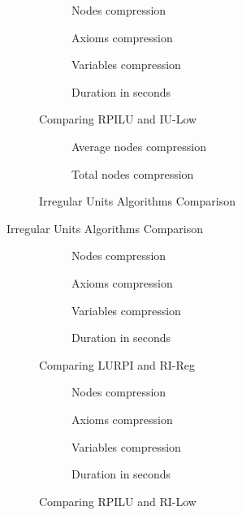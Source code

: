 \begin{figure}[hbt]
  \begin{subfigure}{0.5\textwidth}
    \centering
    \caption{Nodes compression}
  \end{subfigure}
  \begin{subfigure}{0.5\textwidth}
    \centering
    \caption{Axioms compression}
  \end{subfigure}
  \begin{subfigure}{0.5\textwidth}
    \centering
    \caption{Variables compression}
  \end{subfigure}
  \begin{subfigure}{0.5\textwidth}
    \centering
    \caption{Duration in seconds}
  \end{subfigure}
  \caption{Comparing RPILU and IU-Low}
\end{figure}
\begin{figure}[hbt]
  \begin{subfigure}{0.5\textwidth}
    \centering
    \caption{Average nodes compression}
  \end{subfigure}
  \begin{subfigure}{0.5\textwidth}
    \centering
    \caption{Total nodes compression}
  \end{subfigure}
  \caption{Irregular Units Algorithms Comparison}
\end{figure}
\begin{table}[hbt]
  \centering
  \caption{Irregular Units Algorithms Comparison}
\end{table}
\begin{figure}[hbt]
  \begin{subfigure}{0.5\textwidth}
    \centering
    \caption{Nodes compression}
  \end{subfigure}
  \begin{subfigure}{0.5\textwidth}
    \centering
    \caption{Axioms compression}
  \end{subfigure}
  \begin{subfigure}{0.5\textwidth}
    \centering
    \caption{Variables compression}
  \end{subfigure}
  \begin{subfigure}{0.5\textwidth}
    \centering
    \caption{Duration in seconds}
  \end{subfigure}
  \caption{Comparing LURPI and RI-Reg}
\end{figure}
\begin{figure}[hbt]
  \begin{subfigure}{0.5\textwidth}
    \centering
    \caption{Nodes compression}
  \end{subfigure}
  \begin{subfigure}{0.5\textwidth}
    \centering
    \caption{Axioms compression}
  \end{subfigure}
  \begin{subfigure}{0.5\textwidth}
    \centering
    \caption{Variables compression}
  \end{subfigure}
  \begin{subfigure}{0.5\textwidth}
    \centering
    \caption{Duration in seconds}
  \end{subfigure}
  \caption{Comparing RPILU and RI-Low}
\end{figure}
